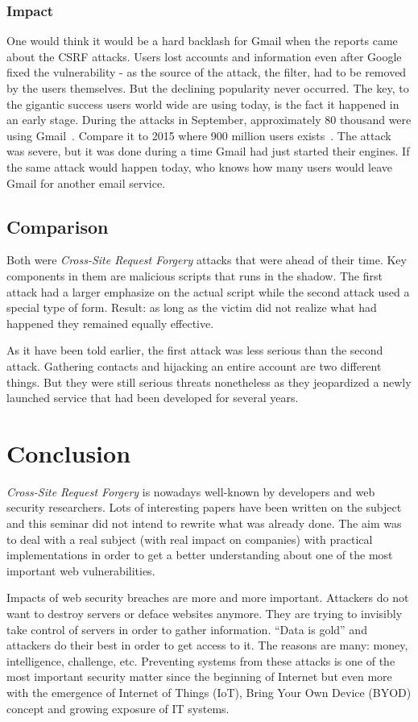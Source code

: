\documentclass[a4paper,11pt,openany]{report}
\newcommand{\csrf}{\textit{Cross-Site Request Forgery}}
\begin{document}
  \subsubsection{Impact}
  One would think it would be a hard backlash for Gmail when the reports came about the CSRF attacks. Users lost 
  accounts and information even after Google fixed the vulnerability - as the source of the attack, the filter, 
  had to be removed by the users themselves. But the declining popularity never occurred. The key, to the gigantic
  success users world wide are using today, is the fact it happened in an early stage. During the attacks in 
  September, approximately 80 thousand were using Gmail~\cite{techcrunch}. Compare it to 2015 where 900 million 
  users exists~\cite{dmr}. The attack was severe, but it was done during a time Gmail had just started their engines. 
  If the same attack would happen today, who knows how many users would leave Gmail for another email service.

  \subsection{Comparison}
  Both were \csrf{} attacks that were ahead of their time. Key components in them are malicious scripts that runs in the 
  shadow. The first attack had a larger emphasize on the actual script while the second attack used a special type of 
  form. Result: as long as the victim did not realize what had happened they remained equally effective.
  
  As it have been told earlier, the first attack was less serious than the second attack. Gathering contacts and 
  hijacking an entire account are two different things. But they were still serious threats nonetheless as they
  jeopardized a newly launched service that had been developed for several years. 
  
  \section{Conclusion}
  \csrf{} is nowadays well-known by developers and web security researchers. Lots of interesting papers have been written 
  on the subject and this seminar did not intend to rewrite what was already done. The aim was to deal with a real subject 
  (with real impact on companies) with practical implementations in order to get a better understanding about one of the 
  most important web vulnerabilities.
  
  Impacts of web security breaches are more and more important. Attackers do not want to destroy servers or deface 
  websites anymore. They are trying to invisibly take control of servers in order to gather information. ``Data is gold'' 
  and attackers do their best in order to get access to it. The reasons are many: money, intelligence, challenge, etc. 
  Preventing systems from these attacks is one of the most important security matter since the beginning of Internet but 
  even more with the emergence of Internet of Things (IoT), Bring Your Own Device (BYOD) concept and growing exposure of 
  IT systems.
  
\end{document}
